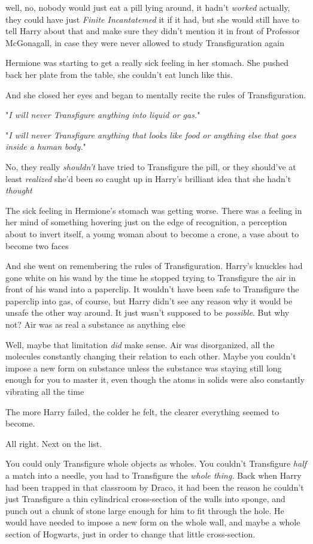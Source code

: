 {\el} well, no, nobody would just eat a pill lying around, it hadn't
\emph{worked} actually, they could have just \emph{Finite Incantatemed} it if
it had, but she would still have to tell Harry about that and make sure they
didn't mention it in front of Professor McGonagall, in case they were never
allowed to study Transfiguration again{\el}

Hermione was starting to get a really sick feeling in her stomach. She pushed
back her plate from the table, she couldn't eat lunch like this.

And she closed her eyes and began to mentally recite the rules of
Transfiguration.

"\emph{I will never Transfigure anything into liquid or gas.}"

"\emph{I will never Transfigure anything that looks like food or anything else
that goes inside a human body.}"

No, they really \emph{shouldn't} have tried to Transfigure the pill, or they
should've at least \emph{realized{\el}} she'd been so caught up in Harry's
brilliant idea that she hadn't \emph{thought{\el}}

The sick feeling in Hermione's stomach was getting worse. There was a feeling
in her mind of something hovering just on the edge of recognition, a perception
about to invert itself, a young woman about to become a crone, a vase about to
become two faces{\el}

And she went on remembering the rules of Transfiguration.
\sbreak
Harry's knuckles had gone white on his wand by the time he stopped trying to
Transfigure the air in front of his wand into a paperclip. It wouldn't have
been safe to Transfigure the paperclip into gas, of course, but Harry didn't
see any reason why it would be unsafe the other way around. It just wasn't
supposed to be \emph{possible}. But why not? Air was as real a substance as
anything else{\el}

Well, maybe that limitation \emph{did} make sense. Air was disorganized, all
the molecules constantly changing their relation to each other. Maybe you
couldn't impose a new form on substance unless the substance was staying still
long enough for you to master it, even though the atoms in solids were also
constantly vibrating all the time{\el}

The more Harry failed, the colder he felt, the clearer everything seemed to
become.

All right. Next on the list.

You could only Transfigure whole objects as wholes. You couldn't Transfigure
\emph{half} a match into a needle, you had to Transfigure the \emph{whole
thing.} Back when Harry had been trapped in that classroom by Draco, it had
been the reason he couldn't just Transfigure a thin cylindrical cross-section
of the walls into sponge, and punch out a chunk of stone large enough for him
to fit through the hole. He would have needed to impose a new form on the whole
wall, and maybe a whole section of Hogwarts, just in order to change that
little cross-section.

